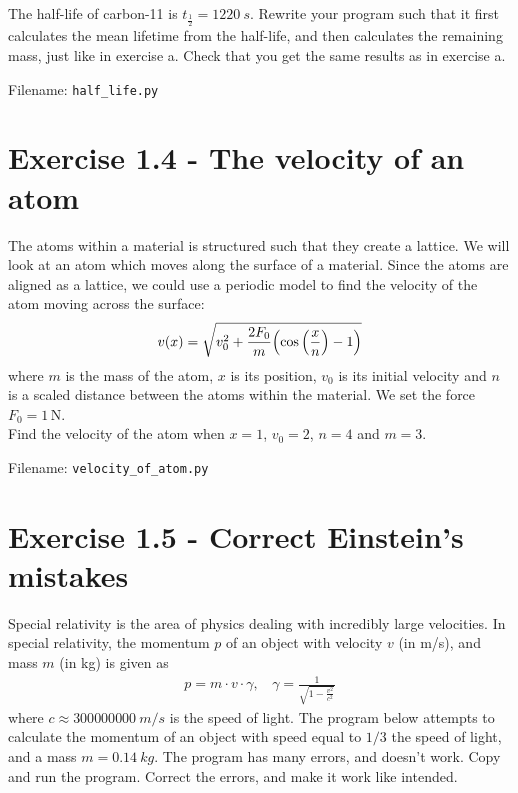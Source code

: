 \documentclass[10pt,a4paper]{article}
\newcommand{\halflife}{t_{\frac{1}{2}}}
\begin{document}
The half-life of carbon-11 is $\halflife = \SI{1220}{s}$. Rewrite your program such that it first calculates the mean lifetime from the half-life, and then calculates the remaining mass, just like in exercise a. Check that you get the same results as in exercise a.

Filename: \texttt{half\_life.py}




	\section*{Exercise 1.4 - The velocity of an atom}
	The atoms within a material is structured such that they create a lattice. 
	We will look at an atom which moves along the surface of a material. Since the atoms are aligned as a lattice, we could use a periodic model to find the velocity of the atom moving across the surface: 
	\begin{equation*}
		v(x) = \sqrt{v_0^2 + \frac{2F_0}{m}\qty(\cos\qty(\frac{x}{n}) -1 )}
	\end{equation*}
	where $m$ is the mass of the atom, $x$ is its position, $v_0$ is its initial velocity and $n$ is a scaled distance between the atoms within the material. We set the force $F_0 = 1\,$N.\\
	Find the velocity of the atom when $x = 1$, $v_0 = 2$, $n = 4$ and $m = 3$.

	Filename: \texttt{velocity\_of\_atom.py}



\section*{Exercise 1.5 - Correct Einstein's mistakes}

Special relativity is the area of physics dealing with incredibly large velocities. In special relativity, the momentum $p$ of an object with velocity $v$ (in m/s), and mass $m$ (in kg) is given as
\begin{align*}
p = m\cdot v\cdot \gamma, \ \ \ \ \gamma = \frac{1}{\sqrt{1-\frac{v^2}{c^2}}}
\end{align*}
where $c\approx \SI{300 000 000}{m/s}$ is the speed of light. The program below attempts to calculate the momentum of an object with speed equal to $1/3$ the speed of light, and a mass $m=\SI{0.14}{kg}$. The program has many errors, and doesn't work. Copy and run the program. Correct the errors, and make it work like intended.
\end{document}

